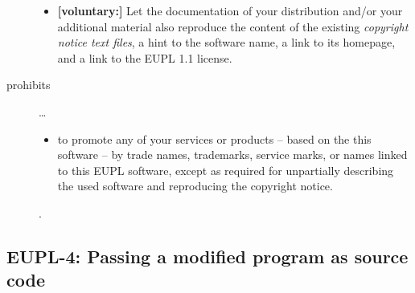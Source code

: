 \begin{description}
\begin{itemize}
  \item \textbf{[voluntary:]} Let the documentation of your distribution and/or
  your additional material also reproduce the content of the existing
  \emph{copyright notice text files}, a hint to the software name, a link to its
  homepage, and a link to the EUPL 1.1 license.
\end{itemize}

\item[prohibits] \ldots
\begin{itemize}
  \item to promote any of your services or products – based on the this software
  – by trade names, trademarks, service marks, or names linked to this EUPL
  software, except as required for unpartially describing the used software and
  reproducing the copyright notice.
\end{itemize}.

\end{description}

\subsection{EUPL-4: Passing a modified program as source code}
\label{OSUC-04-EUPL} 


